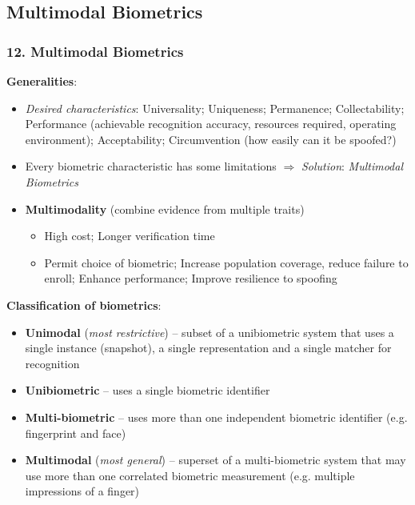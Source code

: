 \documentclass[a4paper]{article}
\begin{document}
  \subsection*{Multimodal Biometrics}
    \subsubsection*{12. Multimodal Biometrics}
      \textbf{Generalities}:
      \begin{itemize}
        \item \emph{Desired characteristics}: Universality; Uniqueness; Permanence; Collectability; Performance (achievable recognition accuracy, resources required, operating environment); Acceptability; Circumvention (how easily can it be spoofed?)
        \item Every biometric characteristic has some limitations $\Rightarrow$ \emph{Solution}: \emph{Multimodal Biometrics}
        \item \textbf{Multimodality} (combine evidence from multiple traits)
        \begin{itemize}
          \item High cost; Longer verification time
          \item Permit choice of biometric; Increase population coverage, reduce failure to enroll; Enhance performance; Improve resilience to spoofing
        \end{itemize}
      \end{itemize}

      \textbf{Classification of biometrics}:
      \begin{itemize}
        \item \textbf{Unimodal} (\emph{most restrictive}) -- subset of a unibiometric system that uses a single instance (snapshot), a single representation and a single matcher for recognition
        \item \textbf{Unibiometric} -- uses a single biometric identifier
        \item \textbf{Multi-biometric} -- uses more than one independent biometric identifier (e.g. fingerprint and face)
        \item \textbf{Multimodal} (\emph{most general}) -- superset of a multi-biometric system that may use more than one correlated biometric measurement (e.g. multiple impressions of a finger)
      \end{itemize}
\end{document}
